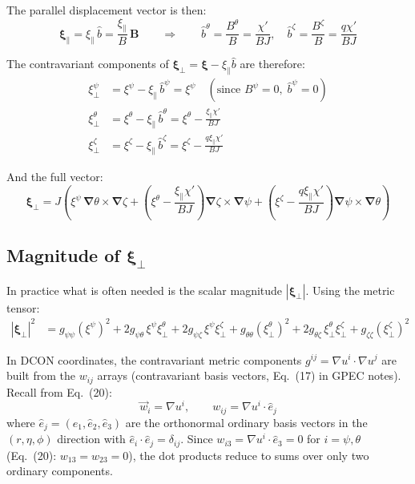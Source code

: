 \documentclass[12pt,a4paper]{article}
\newcommand{\bnabla}{\boldsymbol{\nabla}}
\newcommand{\bxi}{\boldsymbol{\xi}}
\begin{document}
The parallel displacement vector is then:
\begin{equation}
    \bxi_\parallel = \xi_\parallel\,\hat{b} = \frac{\xi_\parallel}{B}\,\mathbf{B}
    \qquad\Longrightarrow\qquad
    \hat{b}^\theta = \frac{B^\theta}{B} = \frac{\chi'}{BJ},\quad \hat{b}^\zeta = \frac{B^\zeta}{B} = \frac{q\chi'}{BJ}
\end{equation}

The contravariant components of $\bxi_\perp = \bxi - \xi_\parallel\hat{b}$ are therefore:
\begin{align}
    \xi^\psi_\perp &= \xi^\psi - \xi_\parallel\,\hat{b}^\psi = \xi^\psi \quad(\text{since }B^\psi=0,\;\hat{b}^\psi=0) \\[4pt]
    \xi^\theta_\perp &= \xi^\theta - \xi_\parallel\,\hat{b}^\theta = \xi^\theta - \frac{\xi_\parallel\chi'}{BJ} \\[4pt]
    \xi^\zeta_\perp &= \xi^\zeta - \xi_\parallel\,\hat{b}^\zeta = \xi^\zeta - \frac{q\xi_\parallel\chi'}{BJ}
    \label{eq:xiperp_components}
\end{align}

And the full vector:
\begin{equation}
    \boxed{
    \bxi_\perp = J\!\left(\xi^\psi\,\bnabla\theta\times\bnabla\zeta
    + \left(\xi^\theta - \frac{\xi_\parallel\chi'}{BJ}\right)\bnabla\zeta\times\bnabla\psi
    + \left(\xi^\zeta - \frac{q\xi_\parallel\chi'}{BJ}\right)\bnabla\psi\times\bnabla\theta\right)
    }
    \label{eq:xiperp_full}
\end{equation}

\subsection{Magnitude of $\bxi_\perp$}

In practice what is often needed is the scalar magnitude $|\bxi_\perp|$. Using the metric tensor:
\begin{align}
    |\bxi_\perp|^2 &= g_{\psi\psi}(\xi^\psi)^2
    + 2g_{\psi\theta}\,\xi^\psi\xi^\theta_\perp
    + 2g_{\psi\zeta}\,\xi^\psi\xi^\zeta_\perp
    + g_{\theta\theta}(\xi^\theta_\perp)^2
    + 2g_{\theta\zeta}\,\xi^\theta_\perp\xi^\zeta_\perp
    + g_{\zeta\zeta}(\xi^\zeta_\perp)^2
    \label{eq:xiperp_mag}
\end{align}

In DCON coordinates, the contravariant metric components $g^{ij} = \nabla u^i \cdot \nabla u^j$ are built from the $w_{ij}$ arrays (contravariant basis vectors, Eq.~(17) in GPEC notes). Recall from Eq.~(20):
\begin{equation}
    \vec{w}_i = \nabla u^i, \qquad w_{ij} = \nabla u^i \cdot \hat{e}_j
\end{equation}
where $\hat{e}_j = (\hat{e}_1, \hat{e}_2, \hat{e}_3)$ are the orthonormal ordinary basis vectors in the $(r,\eta,\phi)$ direction with $\hat{e}_i\cdot\hat{e}_j = \delta_{ij}$. Since $w_{i3} = \nabla u^i \cdot \hat{e}_3 = 0$ for $i = \psi, \theta$ (Eq.~(20): $w_{13}=w_{23}=0$), the dot products reduce to sums over only two ordinary components.
\end{document}
